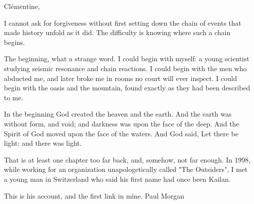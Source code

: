 \typeprologue
\newcommand{\typethresholdexception}{%
\cleardoublepage
\thispagestyle{plain}
\markboth{Threshold Exception}{Threshold Exception}%
\vspace*{1.35in}
\begin{center}
{\Large\scshape Threshold Exception}\par
\vspace{0.18in}
{\color{rulegold}\rule{0.34\textwidth}{0.35pt}}
\end{center}
\vspace{0.62in}
}



Clémentine,\par

I cannot ask for forgiveness without first setting down the chain of events that made history unfold as it did. The difficulty is knowing where such a chain begins. \par

The beginning, what a strange word. I could begin with myself: a young scientist studying seismic resonance and chain reactions. I could begin with the men who abducted me, and later broke me in rooms no court will ever inspect. I could begin with the oasis and the mountain, found exactly as they had been described to me.\par

In the beginning God created the heaven and the earth. And the earth was without form, and void; and darkness was upon the face of the deep. And the Spirit of God moved upon the face of the waters. And God said, Let there be light: and there was light.\par

That is at least one chapter too far back, and, somehow, not far enough. In 1998, while working for an organization unapologetically called "The Outsiders", I met a young man in Switzerland who said his first name had once been Kailan.\par

This is his account, and the first link in mine. Paul Morgan\par


\ornament